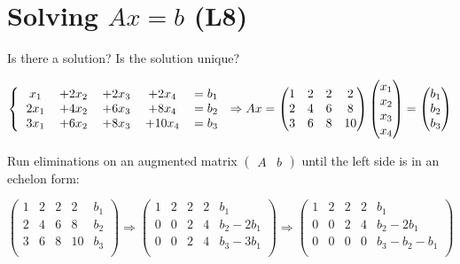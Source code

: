 \documentclass[12pt]{article}
\begin{document}
\section{Solving $Ax = b$ (L8)}

Is there a solution? Is the solution unique?

\[
\left \{
  \begin{tabular}{ccccc}
  $x_1$ & $+2x_2$ & $+2x_3$ & $+2x_4$ & $=b_1$\\
  $2x_1$ & $+4x_2$ & $+6x_3$ & $+8x_4$ & $=b_2$\\
  $3x_1$ & $+6x_2$ & $+8x_3$ & $+10x_4$ & $=b_3$\\
  \end{tabular}
\right
.\Rightarrow
Ax=
\left(
    \begin{matrix}
        1 & 2 & 2 & 2\\
        2 & 4 & 6 & 8\\
        3 & 6 & 8 & 10\\
    \end{matrix}
\right)
\left(
    \begin{matrix}
        x_1\\
        x_2\\
        x_3\\
        x_4\\
    \end{matrix}
\right)
=
\left(
    \begin{matrix}
        b_1\\
        b_2\\
        b_3\\
    \end{matrix}
\right)
\]

Run eliminations on an augmented matrix 
$\left(
    \begin{array}{c|c}
        A & b
    \end{array}
\right)$
until the left side is in an echelon form:

\[
\left(
    \begin{array}{cccc|c}
        \boxed{1} & 2 & 2 & 2 & b_1\\ 
        2 & 4 & 6 & 8 & b_2\\
        3 & 6 & 8 & 10 & b_3\\
    \end{array}
\right)
\Rightarrow
\left(
    \begin{array}{cccc|c}
        \boxed{1} & 2 & 2 & 2 & b_1\\ 
        0 & 0 & \boxed{2} & 4 & b_2 - 2b_1\\
        0 & 0 & 2 & 4 & b_3 - 3b_1\\
    \end{array}
\right)
\Rightarrow
\left(
    \begin{array}{cccc|c}
        \boxed{1} & 2 & 2 & 2 & b_1\\ 
        0 & 0 & \boxed{2} & 4 & b_2 - 2b_1\\
        0 & 0 & 0 & 0 & b_3 - b_2 - b_1\\
    \end{array}
\right)
\]
\end{document}
